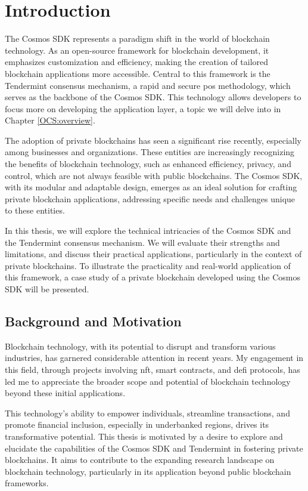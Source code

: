 \chapter{Introduction}
\label{ch:introduccion}

The Cosmos SDK represents a paradigm shift in the world of blockchain technology. As an open-source framework for blockchain development, it emphasizes customization and efficiency, making the creation of tailored blockchain applications more accessible. Central to this framework is the Tendermint consensus mechanism, a rapid and secure \gls{pos} methodology, which serves as the backbone of the Cosmos SDK. This technology allows developers to focus more on developing the application layer, a topic we will delve into in Chapter \ref{OCS:overview}.

The adoption of private blockchains has seen a significant rise recently, especially among businesses and organizations. These entities are increasingly recognizing the benefits of blockchain technology, such as enhanced efficiency, privacy, and control, which are not always feasible with public blockchains. The Cosmos SDK, with its modular and adaptable design, emerges as an ideal solution for crafting private blockchain applications, addressing specific needs and challenges unique to these entities.

In this thesis, we will explore the technical intricacies of the Cosmos SDK and the Tendermint consensus mechanism. We will evaluate their strengths and limitations, and discuss their practical applications, particularly in the context of private blockchains. To illustrate the practicality and real-world application of this framework, a case study of a private blockchain developed using the Cosmos SDK will be presented.

\section{Background and Motivation}

Blockchain technology, with its potential to disrupt and transform various industries, has garnered considerable attention in recent years. My engagement in this field, through projects involving \gls{nft}, smart contracts, and \gls{defi} protocols, has led me to appreciate the broader scope and potential of blockchain technology beyond these initial applications.

This technology's ability to empower individuals, streamline transactions, and promote financial inclusion, especially in underbanked regions, drives its transformative potential. This thesis is motivated by a desire to explore and elucidate the capabilities of the Cosmos SDK and Tendermint in fostering private blockchains. It aims to contribute to the expanding research landscape on blockchain technology, particularly in its application beyond public blockchain frameworks.

